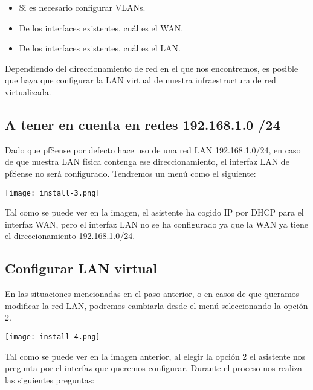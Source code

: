 \begin{itemize}
    \item Si es necesario configurar VLANs.
    \item De los interfaces existentes, cuál es el WAN.
    \item De los interfaces existentes, cuál es el LAN.
\end{itemize}

Dependiendo del direccionamiento de red en el que nos encontremos, es posible que haya que configurar la LAN virtual de nuestra infraestructura de red virtualizada.

\subsection{A tener en cuenta en redes 192.168.1.0 /24}
Dado que pfSense por defecto hace uso de una red LAN 192.168.1.0/24, en caso de que nuestra LAN física contenga ese direccionamiento, el interfaz LAN de pfSense no será configurado. Tendremos un menú como el siguiente:

\begin{center}
    \vspace{-10pt}
    \texttt{[image: install-3.png]}
    \vspace{-10pt}
\end{center}

Tal como se puede ver en la imagen, el asistente ha cogido IP por DHCP para el interfaz WAN, pero el interfaz LAN no se ha configurado ya que la WAN ya tiene el direccionamiento 192.168.1.0/24.

\hypertarget{configurar_lan_virtual}{}
\subsection{Configurar LAN virtual}
En las situaciones mencionadas en el paso anterior, o en casos de que queramos modificar la red LAN, podremos cambiarla desde el menú seleccionando la opción 2.

\begin{center}
    \vspace{-10pt}
    \texttt{[image: install-4.png]}
    \vspace{-10pt}
\end{center}

Tal como se puede ver en la imagen anterior, al elegir la opción 2 el asistente nos pregunta por el interfaz que queremos configurar. Durante el proceso nos realiza las siguientes preguntas:

